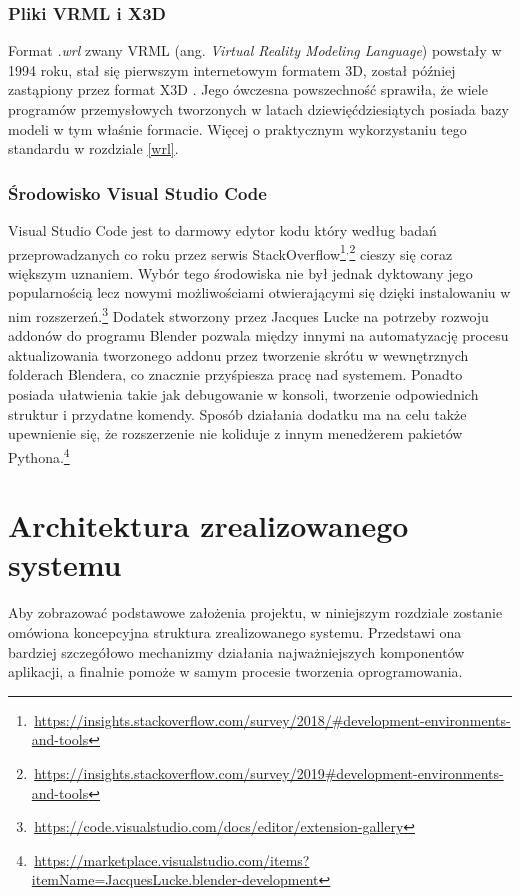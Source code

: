 \documentclass{xmgr}
\begin{document}
\subsection{Pliki VRML i X3D}
Format \emph{.wrl} zwany VRML (ang. \emph {Virtual Reality Modeling Language}) powstały w 1994 roku, stał się pierwszym internetowym formatem 3D, został później zastąpiony przez format X3D \cite{vrml}. Jego ówczesna powszechność sprawiła, że wiele programów przemysłowych tworzonych w latach dziewięćdziesiątych posiada bazy modeli w tym właśnie formacie. Więcej o praktycznym wykorzystaniu tego standardu w rozdziale \ref{wrl}.


\subsection{Środowisko Visual Studio Code}
Visual Studio Code jest to darmowy edytor kodu który według badań przeprowadzanych co roku przez serwis StackOverflow\footnote{\,\url{https://insights.stackoverflow.com/survey/2018/\#development-environments-and-tools}}$^{,}$\footnote{\,\url{https://insights.stackoverflow.com/survey/2019\#development-environments-and-tools}} cieszy się coraz większym uznaniem. Wybór tego środowiska nie był jednak dyktowany jego popularnością lecz nowymi możliwościami otwierającymi się dzięki instalowaniu w nim rozszerzeń.\footnote{\,\url{https://code.visualstudio.com/docs/editor/extension-gallery}} Dodatek stworzony przez Jacques Lucke na potrzeby rozwoju addonów do programu Blender pozwala między innymi na automatyzację procesu aktualizowania tworzonego addonu przez tworzenie skrótu w wewnętrznych folderach Blendera, co znacznie przyśpiesza pracę nad systemem. Ponadto posiada ułatwienia takie jak debugowanie w konsoli, tworzenie odpowiednich struktur i przydatne komendy. Sposób działania dodatku ma na celu także upewnienie się, że rozszerzenie nie koliduje z innym menedżerem pakietów Pythona.\footnote{\,\url{https://marketplace.visualstudio.com/items?itemName=JacquesLucke.blender-development}} 

\chapter{Architektura zrealizowanego systemu}
Aby zobrazować podstawowe założenia projektu, w niniejszym rozdziale zostanie omówiona koncepcyjna struktura zrealizowanego systemu. Przedstawi ona bardziej szczegółowo mechanizmy działania najważniejszych komponentów aplikacji, a finalnie pomoże w samym procesie tworzenia oprogramowania.
\end{document}
